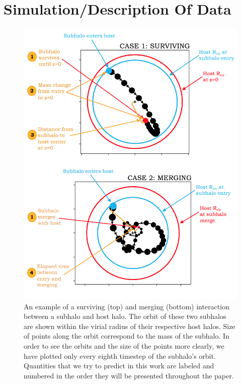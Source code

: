 \documentclass[fleqn,usenatbib]{mnras}
\begin{document}
\section{Simulation/Description Of Data}
\label{sec:simulation}
\begin{figure}
	\includegraphics[width=\columnwidth]{Figures/explanatory_figures}
    \caption{An example of a surviving (top) and merging (bottom) interaction between a subhalo and host halo. The orbit of these two subhalos are shown within the virial radius of their respective host halos. Size of points along the orbit correspond to the mass of the subhalo. In order to see the orbits and the size of the points more clearly, we have plotted only every eighth timestep of the subhalo's orbit. Quantities that we try to predict in this work are labeled and numbered in the order they will be presented throughout the paper.}
    \label{fig:explanatory_figures}
\end{figure}
\end{document}
